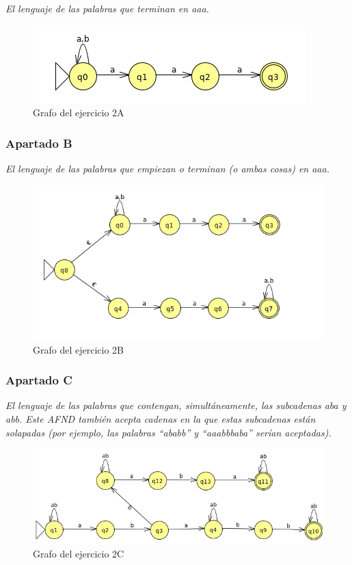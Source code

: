 \textit{El lenguaje de las palabras que terminan en aaa.}

\begin{figure}[h]
	\centering
	\includegraphics[width=0.6\linewidth]{image/ejercicio4}
	\caption[prac 2 - ejer 2A]{Grafo del ejercicio 2A}
	\label{fig:ejercicio2A}
\end{figure}

\newpage

\subsubsection{Apartado B}

\textit{El lenguaje de las palabras que empiezan o terminan (o ambas cosas) en aaa.}

\begin{figure}[h]
	\centering
	\includegraphics[width=0.8\linewidth]{image/ejercicio5}
	\caption[prac 2 - ejer 2B]{Grafo del ejercicio 2B}
	\label{fig:ejercicio2B}
\end{figure}

\subsubsection{Apartado C}

\textit{El lenguaje de las palabras que contengan, simultáneamente, las subcadenas aba y abb. \newline
Este AFND también acepta cadenas en la que estas subcadenas están solapadas (por ejemplo, las palabras “ababb” y “aaabbbaba” serían aceptadas).}

\begin{figure}[H]
	\centering
	\includegraphics[width=1\linewidth]{image/ejercicio6}
	\caption[prac 2 - ejer 2C]{Grafo del ejercicio 2C}
	\label{fig:ejercicio2C}
\end{figure}

